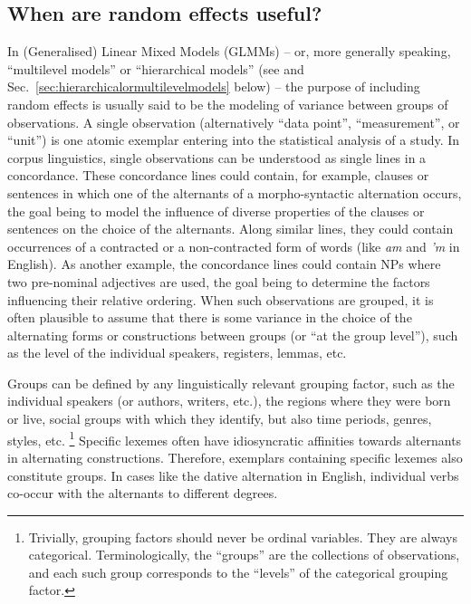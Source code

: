 \subsection{When are random effects useful?}
\label{sec:whenrandomeffectsareuseful}

In (Generalised) Linear Mixed Models (GLMMs) -- or, more generally speaking, ``multilevel models'' or ``hierarchical models'' (see \citealp{GelmanHill2007} and Sec.~\ref{sec:hierarchicalormultilevelmodels} below) -- the purpose of including random effects is usually said to be the modeling of variance between groups of observations.
A single observation (alternatively ``data point'', ``measurement'', or ``unit'') is one atomic exemplar entering into the statistical analysis of a study.
In corpus linguistics, single observations can be understood as single lines in a concordance.
These concordance lines could contain, for example, clauses or sentences in which one of the alternants of a morpho-syntactic alternation occurs, the goal being to model the influence of diverse properties of the clauses or sentences on the choice of the alternants.
Along similar lines, they could contain occurrences of a contracted or a non-contracted form of words (like \textit{am} and \textit{'m} in English).
As another example, the concordance lines could contain NPs where two pre-nominal adjectives are used, the goal being to determine the factors influencing their relative ordering.
When such observations are grouped, it is often plausible to assume that there is some variance in the choice of the alternating forms or constructions between groups (or ``at the group level''), such as the level of the individual speakers, registers, lemmas, etc.

Groups can be defined by any linguistically relevant grouping factor, such as the individual speakers (or authors, writers, etc.), the regions where they were born or live, social groups with which they identify, but also time periods, genres, styles, etc.%
\footnote{Trivially, grouping factors should never be ordinal variables.
They are always categorical.
Terminologically, the ``groups'' are the collections of observations, and each such group corresponds to the ``levels'' of the categorical grouping factor.}
Specific lexemes often have idiosyncratic affinities towards alternants in alternating constructions.
Therefore, exemplars containing specific lexemes also constitute groups.
In cases like the dative alternation in English, individual verbs co-occur with the alternants to different degrees.

